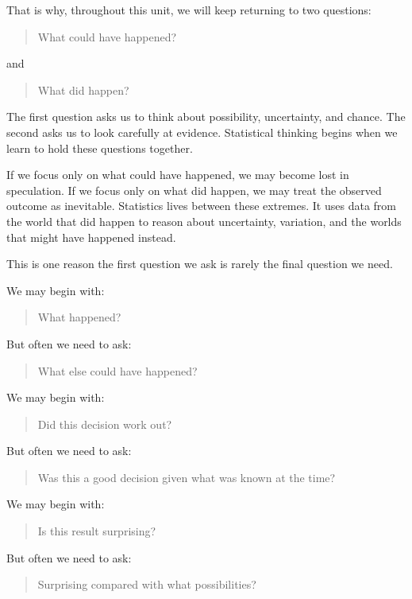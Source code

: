 \documentclass[
  letterpaper,
  DIV=11,
  numbers=noendperiod]{scrreprt}
\begin{document}
That is why, throughout this unit, we will keep returning to two
questions:

\begin{quote}
What could have happened?
\end{quote}

and

\begin{quote}
What did happen?
\end{quote}

The first question asks us to think about possibility, uncertainty, and
chance. The second asks us to look carefully at evidence. Statistical
thinking begins when we learn to hold these questions together.

If we focus only on what could have happened, we may become lost in
speculation. If we focus only on what did happen, we may treat the
observed outcome as inevitable. Statistics lives between these extremes.
It uses data from the world that did happen to reason about uncertainty,
variation, and the worlds that might have happened instead.

This is one reason the first question we ask is rarely the final
question we need.

We may begin with:

\begin{quote}
What happened?
\end{quote}

But often we need to ask:

\begin{quote}
What else could have happened?
\end{quote}

We may begin with:

\begin{quote}
Did this decision work out?
\end{quote}

But often we need to ask:

\begin{quote}
Was this a good decision given what was known at the time?
\end{quote}

We may begin with:

\begin{quote}
Is this result surprising?
\end{quote}

But often we need to ask:

\begin{quote}
Surprising compared with what possibilities?
\end{quote}
\end{document}
